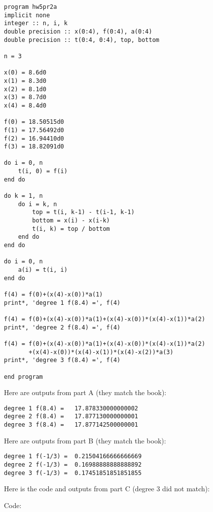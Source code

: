 \documentclass[12pt]{article}
\begin{document}
\begin{verbatim}
program hw5pr2a
implicit none
integer :: n, i, k
double precision :: x(0:4), f(0:4), a(0:4)
double precision :: t(0:4, 0:4), top, bottom

n = 3 

x(0) = 8.6d0
x(1) = 8.3d0
x(2) = 8.1d0
x(3) = 8.7d0
x(4) = 8.4d0

f(0) = 18.50515d0
f(1) = 17.56492d0
f(2) = 16.94410d0
f(3) = 18.82091d0

do i = 0, n
	t(i, 0) = f(i)
end do

do k = 1, n
	do i = k, n 
		top = t(i, k-1) - t(i-1, k-1)
		bottom = x(i) - x(i-k)
		t(i, k) = top / bottom
	end do
end do

do i = 0, n
	a(i) = t(i, i)
end do

f(4) = f(0)+(x(4)-x(0))*a(1)
print*, 'degree 1 f(8.4) =', f(4)

f(4) = f(0)+(x(4)-x(0))*a(1)+(x(4)-x(0))*(x(4)-x(1))*a(2)
print*, 'degree 2 f(8.4) =', f(4)

f(4) = f(0)+(x(4)-x(0))*a(1)+(x(4)-x(0))*(x(4)-x(1))*a(2)
       +(x(4)-x(0))*(x(4)-x(1))*(x(4)-x(2))*a(3)
print*, 'degree 3 f(8.4) =', f(4)

end program
\end{verbatim}

Here are outputs from part A (they match the book):

\begin{verbatim}
degree 1 f(8.4) =   17.878330000000002
degree 2 f(8.4) =   17.877130000000001
degree 3 f(8.4) =   17.877142500000001
\end{verbatim}
 
Here are outputs from part B (they match the book):

\begin{verbatim}
degree 1 f(-1/3) =  0.21504166666666669
degree 2 f(-1/3) =  0.16988888888888892
degree 3 f(-1/3) =  0.17451851851851855
\end{verbatim}

Here is the code and outputs from part C (degree 3 did not match):

Code:
\end{document}

